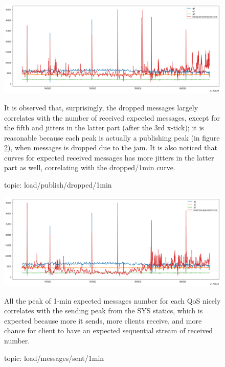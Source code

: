 \documentclass[12pt, letterpaper]{article}
\begin{document}
\begin{figure}
	\setlength{\tabcolsep}{0pt}
	\caption{topic: load/publish/dropped/1min}
	\label{f:valid_cnt_load_publish_dropped_1min}
	\begin{center}
	
		\includegraphics[width=\textwidth]{valid_cnt/valid_cnt-load_publish_dropped_1min}
	
	\end{center}
	It is observed that, surprisingly, the dropped messages largely correlates with the number of received expected messages, except for the fifth and jitters in the latter part (after the 3rd x-tick); it is reasonable because each peak is actually a publishing peak (in figure \ref{f:valid_cnt_load_messages_sent_1min}), when messages is dropped due to the jam. It is also noticed that curves for expected received messages has more jitters in the latter part as well, correlating with the dropped/1min curve.
\end{figure}

\begin{figure}
	\caption{topic: load/messages/sent/1min}
	\label{f:valid_cnt_load_messages_sent_1min}
	\begin{center}
		\includegraphics[width=\textwidth]{valid_cnt/valid_cnt-load_messages_sent_1min}
	\end{center}
	All the peak of 1-min expected messages number for each QoS nicely correlates with the sending peak from the SYS statics, which is expected because more it sends, more clients receive, and more chance for client to have an expected  sequential stream of received number.
\end{figure}
\end{document}
